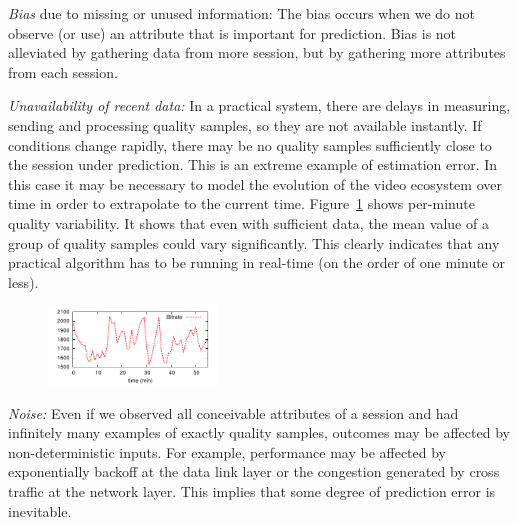 \begin{packedenumerate}
\item \emph{Bias} due to missing or unused information: The bias occurs when we do not observe (or use) an attribute that is important for prediction. Bias is not alleviated by gathering data from more session, but by gathering more attributes from each session.

\item \emph{Unavailability of recent data:} In a practical system, there are delays in measuring, sending and processing quality samples, so they are not available instantly.  If conditions change rapidly, there may be no quality samples sufficiently close to the session under prediction.  This is an extreme example of estimation error.  In this case it may be necessary to model the evolution of the video ecosystem over time in order to extrapolate to the current time. Figure~\ref{fig:quality-variability} shows per-minute quality variability. It shows that even with sufficient data, the mean value of a group of quality samples could vary significantly. This clearly indicates that any practical algorithm has to be running in real-time (on the order of one minute or less).

\begin{figure}[h!]
\centering
 \includegraphics[width=0.4\textwidth] {figures/quality-time.pdf}
\label{fig:quality-variability}
\end{figure}

  \item \emph{Noise:} Even if we observed all conceivable attributes of a session and had infinitely many examples of exactly quality samples, outcomes may be affected by non-deterministic inputs.  For example, performance may be affected by exponentially backoff at the data link layer or the congestion generated by cross traffic at the network layer. This implies that some degree of prediction error is inevitable.
\end{packedenumerate}

